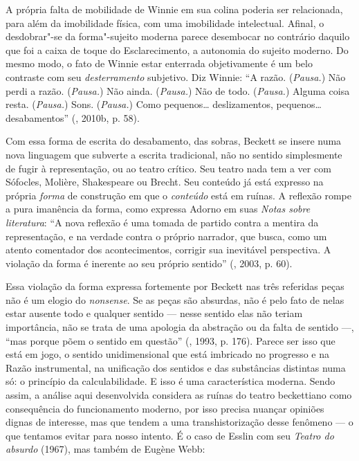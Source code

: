 A própria falta de mobilidade de Winnie em sua colina poderia ser
relacionada, para além da imobilidade física, com uma imobilidade
intelectual. Afinal, o desdobrar"-se da forma"-sujeito moderna parece
desembocar no contrário daquilo que foi a caixa de toque do
Esclarecimento, a autonomia do sujeito moderno. Do mesmo modo, o fato de
Winnie estar enterrada objetivamente é um belo contraste com seu
\emph{desterramento} subjetivo. Diz Winnie: ``A razão. (\emph{Pausa.})
Não perdi a razão. (\emph{Pausa.}) Não ainda. (\emph{Pausa.}) Não de
todo. (\emph{Pausa.}) Alguma coisa resta. (\emph{Pausa.}) Sons.
(\emph{Pausa.}) Como pequenos\ldots{} deslizamentos, pequenos\ldots{}
desabamentos'' (, 2010b, p. 58).

Com essa forma de escrita do desabamento, das sobras, Beckett se insere
numa nova linguagem que subverte a escrita tradicional, não no sentido
simplesmente de fugir à representação, ou ao teatro crítico. Seu teatro
nada tem a ver com Sófocles, Molière, Shakespeare ou Brecht. Seu
conteúdo já está expresso na própria \emph{forma} de construção em que o
\emph{conteúdo} está em ruínas. A reflexão rompe a pura imanência da
forma, como expressa Adorno em suas \emph{Notas sobre literatura}: ``A
nova reflexão é uma tomada de partido contra a mentira da representação,
e na verdade contra o próprio narrador, que busca, como um atento
comentador dos acontecimentos, corrigir sua inevitável perspectiva. A
violação da forma é inerente ao seu próprio sentido'' (, 2003, p. 60).

Essa violação da forma expressa fortemente por Beckett nas três
referidas peças não é um elogio do \emph{nonsense}. Se as peças são
absurdas, não é pelo fato de nelas estar ausente todo e qualquer sentido
--- nesse sentido elas não teriam importância, não se trata de uma
apologia da abstração ou da falta de sentido ---, ``mas porque põem o
sentido em questão'' (, 1993, p. 176). Parece ser isso que está em
jogo, o sentido unidimensional que está imbricado no progresso e na
Razão instrumental, na unificação dos sentidos e das substâncias
distintas numa só: o princípio da calculabilidade. E isso é uma
característica moderna. Sendo assim, a análise aqui desenvolvida considera as ruínas
do teatro beckettiano como consequência do funcionamento moderno, por
isso precisa nuançar opiniões dignas de interesse, mas que tendem a uma
transhistorização desse fenômeno --- o que tentamos evitar para nosso
intento. É o caso de Esslin com seu \emph{Teatro do absurdo} (1967), mas
também de Eugène Webb:

